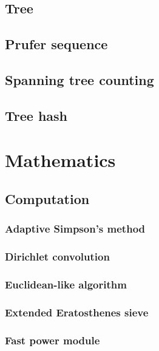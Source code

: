 \documentclass[titlepage,a4paper,10pt]{article}
\begin{document}
\begin{multicols}{2}
\begin{spacing}{0.8}
{			\subsection{Tree}
				\subsection{Prufer sequence}
					
				\subsection{Spanning tree counting}
					
				\subsection{Tree hash}
					
		\section{Mathematics}
			\subsection{Computation}
				\subsubsection{Adaptive Simpson's method}
					
				\subsubsection{Dirichlet convolution}
					
				\subsubsection{Euclidean-like algorithm}
					
				\subsubsection{Extended Eratosthenes sieve}
					
				\subsubsection{Fast power module}
					
}
\end{spacing}
\end{multicols}
\end{document}
